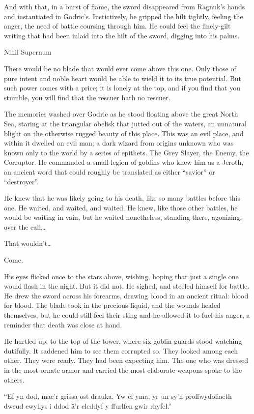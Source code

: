 And with that, in a burst of flame, the sword disappeared from Ragnuk’s hands and instantiated in Godric’s. Instictively, he gripped the hilt tightly, feeling the anger, the need of battle coursing through him. He could feel the finely-gilt writing that had been inlaid into the hilt of the sword, digging into his palms.

Nihil Supernum

There would be no blade that would ever come above this one. Only those of pure intent and noble heart would be able to wield it to its true potential. But such power comes with a price; it is lonely at the top, and if you find that you stumble, you will find that the rescuer hath no rescuer.

The memories washed over Godric as he stood floating above the great North Sea, staring at the triangular obelisk that jutted out of the waters, an unnatural blight on the otherwise rugged beauty of this place. This was an evil place, and within it dwelled an evil man; a dark wizard from origins unknown who was known only to the world by a series of epithets. The Grey Slayer, the Enemy, the Corruptor. He commanded a small legion of goblins who knew him as a-Jeroth, an ancient word that could roughly be translated as either “savior” or “destroyer”.

He knew that he was likely going to his death, like so many battles before this one. He waited, and waited, and waited. He knew, like those other battles, he would be waiting in vain, but he waited nonetheless, standing there, agonizing, over the call…

That wouldn’t…

Come.

His eyes flicked once to the stars above, wishing, hoping that just a single one would flash in the night. But it did not. He sighed, and steeled himself for battle. He drew the sword across his forearms, drawing blood in an ancient ritual: blood for blood. The blade took in the precious liquid, and the wounds healed themselves, but he could still feel their sting and he allowed it to fuel his anger, a reminder that death was close at hand.

He hurtled up, to the top of the tower, where six goblin guards stood watching dutifully. It saddened him to see them corrupted so. They looked among each other. They were ready. They had been expecting him. The one who was dressed in the most ornate armor and carried the most elaborate weapons spoke to the others.

“Ef yn dod, mae’r grissa ost drauka. Yw ef yma, yr un sy’n proffwydoliaeth dweud ewyllys i ddod â’r cleddyf y ffurlfen gwir rhyfel.”

